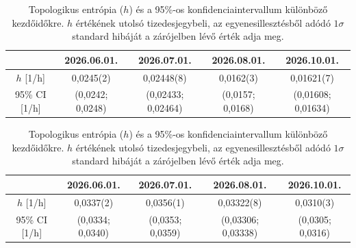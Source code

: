 \documentclass[12pt,a4paper]{article}
\begin{document}
\begin{table}[H]
    \centering
    \begin{subtable}{\textwidth}
        \centering
        \begin{tabular}{|c|c|c|c|c|}\hline
            & \textbf{2026.06.01.} & \textbf{2026.07.01.} & \textbf{2026.08.01.} & \textbf{2026.10.01.} \\\hline
            $h$ [1/h] & 0,0245(2) & 0,02448(8) & 0,0162(3) & 0,01621(7) \\\hline
            95\% CI [1/h] & (0,0242; 0,0248) & (0,02433; 0,02464) & (0,0157; 0,0168) & (0,01608; 0,01634) \\\hline
        \end{tabular}
        \caption{AIFS}
    \end{subtable}

    \vspace{0.6cm}

    \begin{subtable}{\textwidth}
        \centering
        \begin{tabular}{|c|c|c|c|c|}\hline
            & \textbf{2026.06.01.} & \textbf{2026.07.01.} & \textbf{2026.08.01.} & \textbf{2026.10.01.} \\\hline
            $h$ [1/h] & 0,0337(2) & 0,0356(1) & 0,03322(8) & 0,0310(3) \\\hline
            95\% CI [1/h] & (0,0334; 0,0340) & (0,0353; 0,0359) & (0,03306; 0,03338) & (0,0305; 0,0316) \\\hline
        \end{tabular}
        \caption{IFS}
    \end{subtable}
    \caption{Topologikus entrópia ($h$) és a 95\%-os konfidenciaintervallum különböző kezdőidőkre. $h$ értékének utolsó tizedesjegybeli, az egyenesillesztésből adódó $1 \sigma$ standard hibáját a zárójelben lévő érték adja meg.}
    \label{tab:hun850_top}
\end{table}
\end{document}
